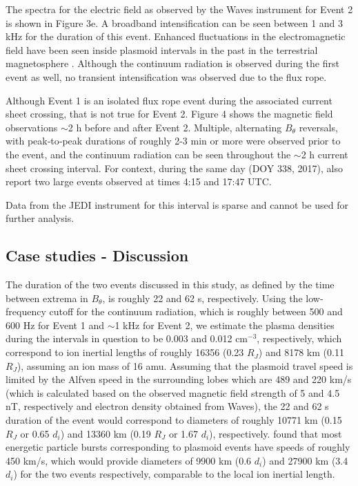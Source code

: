 The spectra for the electric field as observed by the Waves instrument for Event 2 is shown in Figure 3e. A broadband intensification can be seen between 1 and 3 kHz for the duration of this event. Enhanced fluctuations in the electromagnetic field have been seen inside plasmoid intervals in the past in the terrestrial magnetosphere \cite{Kennel1986PlasmaRopes}. Although the continuum radiation is observed during the first event as well, no transient intensification was observed due to the flux rope.

Although Event 1 is an isolated flux rope event during the associated current sheet crossing, that is not true for Event 2. Figure 4 shows the magnetic field observations $\sim$2 h before and after Event 2. Multiple, alternating $B_\theta$ reversals, with peak‐to‐peak durations of roughly 2-3 min or more were observed prior to the event, and the continuum radiation can be seen throughout the $\sim$2 h current sheet crossing interval. For context, during the same day (DOY 338, 2017),  also report two large events observed at times 4:15 and 17:47 UTC.

Data from the JEDI instrument for this interval is sparse and cannot be used for further analysis.

\subsection{Case studies - Discussion}

The duration of the two events discussed in this study, as defined by the time between extrema in $B_\theta$, is roughly 22 and 62 s, respectively. Using the low-frequency cutoff for the continuum radiation, which is roughly between 500 and 600 Hz for Event 1 and $\sim$1 kHz for Event 2, we estimate the plasma densities \cite{Barnhart2009ElectronSpectra} during the intervals in question to be 0.003 and 0.012 cm$^{-3}$, respectively, which correspond to ion inertial lengths of roughly 16356 (0.23 $R_J$) and 8178 km (0.11 $R_J$), assuming an ion mass of 16 amu. Assuming that the plasmoid travel speed is limited by the Alfven speed in the surrounding lobes \cite{Cowley2015Down-tailMagnetospheres} which are 489 and 220 km/s (which is calculated based on the observed magnetic field strength of 5 and 4.5 nT, respectively and electron density obtained from Waves), the 22 and 62 s duration of the event would correspond to diameters of roughly 10771 km (0.15 $R_J$ or 0.65 $d_i$) and 13360 km (0.19 $R_J$ or 1.67 $d_i$), respectively.  found that most energetic particle bursts corresponding to plasmoid events have speeds of roughly 450 km/s, which would provide diameters of 9900 km (0.6 $d_i$) and 27900 km (3.4 $d_i$) for the two events respectively, comparable to the local ion inertial length.

